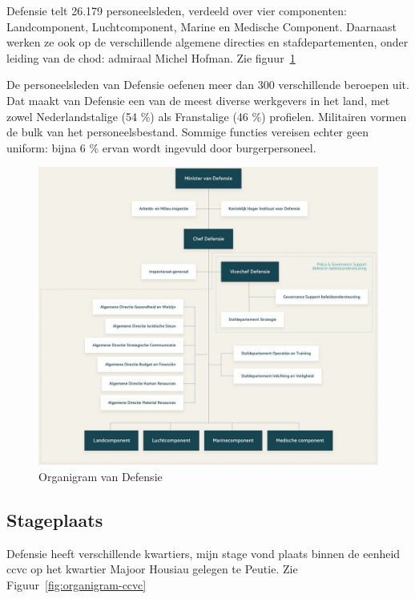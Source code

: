 Defensie telt 26.179 personeelsleden, verdeeld over vier componenten: Landcomponent, Luchtcomponent, Marine en Medische Component. Daarnaast werken ze ook op de verschillende algemene directies en stafdepartementen, onder leiding van de \gls{chod}: admiraal Michel Hofman. Zie figuur~\ref{fig:organigram-defensie}

De personeelsleden van Defensie oefenen meer dan 300 verschillende beroepen uit. Dat maakt van Defensie een van de meest diverse werkgevers in het land, met zowel Nederlandstalige (54 \%) als Franstalige (46 \%) profielen. Militairen vormen de bulk van het personeelsbestand. Sommige functies vereisen echter geen uniform: bijna 6 \% ervan wordt ingevuld door burgerpersoneel. \autocite{Defensie2022}

\begin{figure}
    \includegraphics[width=\textwidth]{img/organigram-defensie.png}
    \caption{\label{fig:organigram-defensie}Organigram van Defensie~\autocite{Defensie2022}}
\end{figure}

\subsection{Stageplaats}

Defensie heeft verschillende \glspl{kwartier}, mijn stage vond plaats binnen de \gls{eenheid} \gls{ccvc} op het \gls{kwartier} Majoor Housiau gelegen te Peutie. Zie Figuur~\ref{fig:organigram-ccvc}

